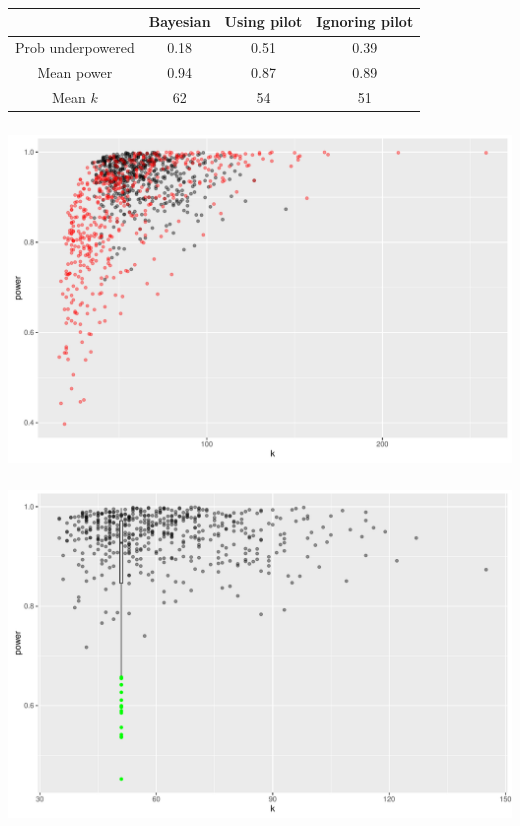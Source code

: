 \documentclass{beamer}
\begin{document}
\begin{frame}
\frametitle{}
\begin{tabular}{c c c c}
\toprule
 & Bayesian & Using pilot & Ignoring pilot \\
\midrule
Prob underpowered 	& 0.18 & 0.51 & 0.39 \\
Mean power			& 0.94 & 0.87 & 0.89 \\
Mean $k$			& 62 & 54 & 51 \\
\bottomrule
\end{tabular}
\end{frame}

\begin{frame}
\frametitle{}
\includegraphics[scale=0.5]{./1vs2.pdf}
\end{frame}

\begin{frame}
\frametitle{}
\includegraphics[scale=0.5]{./1vs3.pdf}
\end{frame}
\end{document}
